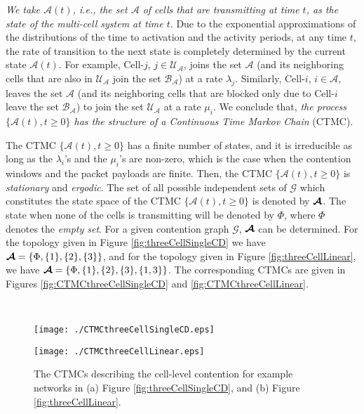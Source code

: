 \documentclass[10pt,a4paper,journal]{IEEEtran}
\theoremstyle{definition}
\theoremstyle{remark}
\theoremstyle{plain}
\newcommand{\bmath}[1]{\mbox{\boldmath$#1$}}
\begin{document}
\textit{We take $\mathcal{A}(t)$, i.e., the set $\mathcal{A}$ of cells that are transmitting at time $t$, as the state of the multi-cell system at time $t$}. Due to the exponential approximations of the distributions of the time to activation and the activity periods, at any time $t$, the rate of transition to the next state is completely determined by the current state $\mathcal{A}(t)$. For example, Cell-$j$, $j \in \mathcal{U}_{\mathcal{A}}$, joins the set $\mathcal{A}$ (and its neighboring cells that are also in $\mathcal{U}_{\mathcal{A}}$ join the set $\mathcal{B}_{\mathcal{A}}$) at a rate $\lambda_j$. Similarly, Cell-$i$, $i \in \mathcal{A}$, leaves the set $\mathcal{A}$ (and its neighboring cells that are blocked only due to Cell-$i$ leave the set $\mathcal{B}_{\mathcal{A}}$) to join the set $\mathcal{U}_{\mathcal{A}}$ at a rate $\mu_i$. We conclude that, \textit{the process $\{\mathcal{A}(t), t \geq 0\}$ has the structure of a Continuous Time Markov Chain} (CTMC). 

The CTMC $\{\mathcal{A}(t), t \geq 0\}$ has a finite number of states, and it is irreducible as long as the $\lambda_i$'s and the $\mu_i$'s are non-zero, which is the case when the contention windows and the packet payloads are finite. Then, the CTMC $\{\mathcal{A}(t), t \geq 0\}$ is \textit{stationary} and \textit{ergodic}. The set of all possible independent sets of $\mathcal{G}$ which constitutes the state space of the CTMC $\{\mathcal{A}(t), t \geq 0\}$ is denoted by $\bmath{\mathcal{A}}$. The state when none of the cells is transmitting will be denoted by $\Phi$, where $\Phi$ denotes the \textit{empty set}. For a given contention graph $\mathcal{G}$, $\bmath{\mathcal{A}}$ can be determined. For the topology given in Figure \ref{fig:threeCellSingleCD} we have $\bmath{\mathcal{A}} = \{\Phi,\{1\},\{2\},\{3\}\}$, and for the topology given in Figure \ref{fig:threeCellLinear}, we have $\bmath{\mathcal{A}} = \{\Phi,\{1\},\{2\},\{3\},\{1,3\}\}$. The corresponding CTMCs are given in Figures \ref{fig:CTMCthreeCellSingleCD} and \ref{fig:CTMCthreeCellLinear}.


\begin{figure}[tb]
  \centering \
  \begin{minipage}{3.5cm}
    \begin{center}
      \texttt{[image: ./CTMCthreeCellSingleCD.eps]}
      \subfigure[]{\label{fig:CTMCthreeCellSingleCD}}
    \end{center}
  \end{minipage}
  \hspace{0.5cm}
  \begin{minipage}{3.5cm}
    \begin{center}      \texttt{[image: ./CTMCthreeCellLinear.eps]}
      \subfigure[]{\label{fig:CTMCthreeCellLinear}}
    \end{center}
  \end{minipage}
  \caption{The CTMCs describing the cell-level contention for example
    networks in (a) Figure \ref{fig:threeCellSingleCD}, and (b) Figure
    \ref{fig:threeCellLinear}.}
\end{figure}
\end{document}
